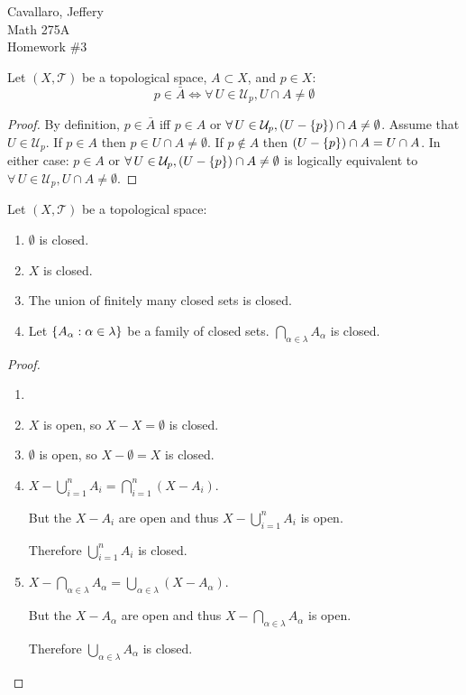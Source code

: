 \documentclass[letterpaper,12pt,fleqn]{article}
\newcommand{\T}{\mathscr{T}}
\newcommand{\U}{\mathcal{U}}
\renewcommand{\a}{\alpha}
\renewcommand{\l}{\lambda}
\begin{document}
Cavallaro, Jeffery \\
Math 275A \\
Homework \#3

\bigskip

\begin{lemma}
  Let \((X,\T)\) be a topological space, \(A\subset X\), and \(p\in X\):
  \[p\in\bar{A}\iff\forall\,U\in\U_p,U\cap A\ne\emptyset\]
\end{lemma}

\begin{proof}
  By definition, \(p\in\bar{A}\) iff \(p\in A\) or \(\forall\,U\in\U_p,(U-\set{p})\cap A\ne\emptyset\).  Assume that
  \(U\in\U_p\).  If \(p\in A\) then \(p\in U\cap A\ne\emptyset\).  If \(p\notin A\) then
  \((U-\{p\})\cap A=U\cap A\).  In either case: \(p\in A\) or \(\forall\,U\in\U_p,(U-\set{p})\cap A\ne\emptyset\)
  is logically equivalent to \(\forall\,U\in\U_p,U\cap A\ne\emptyset\).
\end{proof}

\begin{theorem}[2.16]
  Let \((X,\T)\) be a topological space:
  \begin{enumerate}
  \item \(\emptyset\) is closed.
  \item \(X\) is closed.
  \item The union of finitely many closed sets is closed.
  \item Let \(\set{A_{\a}:\a\in\l}\) be a family of closed sets.  \(\bigcap_{\a\in\l}A_{\a}\) is closed.
  \end{enumerate}
\end{theorem}

\begin{proof}
  \begin{enumerate}
  \item[]
  \item \(X\) is open, so \(X-X=\emptyset\) is closed.
  \item \(\emptyset\) is open, so \(X-\emptyset=X\) is closed.
  \item \(X-\bigcup_{i=1}^nA_i=\bigcap_{i=1}^n(X-A_i)\).

    But the \(X-A_i\) are open and thus \(X-\bigcup_{i=1}^nA_i\) is open.

    Therefore \(\bigcup_{i=1}^nA_i\) is closed.

  \item \(X-\bigcap_{\a\in\l}A_{\a}=\bigcup_{\a\in\l}(X-A_{\a})\).

    But the \(X-A_{\a}\) are open and thus \(X-\bigcap_{\a\in\l}A_{\a}\) is open.

    Therefore \(\bigcup_{\a\in\l}A_{\a}\) is closed.
  \end{enumerate}
\end{proof}
\end{document}
